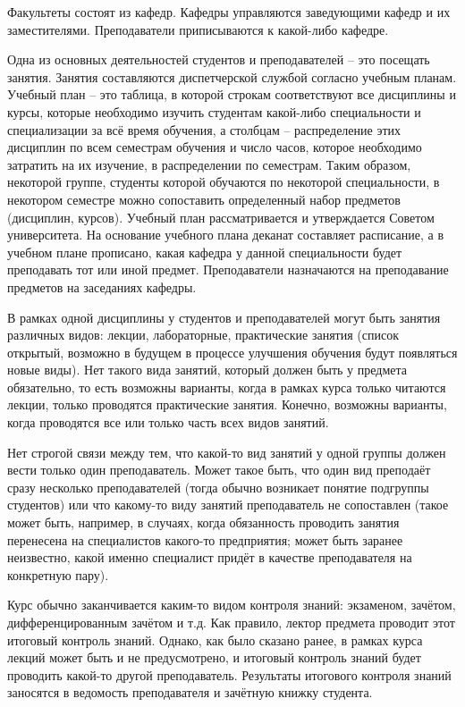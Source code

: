 Факультеты состоят из кафедр. Кафедры управляются заведующими кафедр и их заместителями. Преподаватели приписываются к какой-либо кафедре. 

Одна из основных деятельностей студентов и преподавателей -- это посещать занятия. Занятия составляются диспетчерской службой согласно учебным планам. Учебный план -- это таблица, в которой строкам соответствуют все дисциплины и курсы, которые необходимо изучить студентам какой-либо специальности и специализации за всё время обучения, а столбцам -- распределение этих дисциплин по всем семестрам обучения и число часов, которое необходимо затратить на их изучение, в распределении по семестрам. Таким образом, некоторой группе, студенты которой обучаются по некоторой специальности, в некотором семестре можно сопоставить определенный набор предметов (дисциплин, курсов). Учебный план рассматривается и утверждается Советом университета. На основание учебного плана деканат составляет расписание, а в учебном плане прописано, какая кафедра у данной специальности будет преподавать тот или иной предмет. Преподаватели назначаются на преподавание предметов на заседаниях кафедры.

В рамках одной дисциплины у студентов и преподавателей могут быть занятия различных видов: лекции, лабораторные, практические занятия (список открытый, возможно в будущем в процессе улучшения обучения будут появляться новые виды). Нет такого вида занятий, который должен быть у предмета обязательно, то есть возможны варианты, когда в рамках курса только читаются лекции, только проводятся практические занятия. Конечно, возможны варианты, когда проводятся все или только часть всех видов занятий. 

Нет строгой связи между тем, что какой-то вид занятий у одной группы должен вести только один преподаватель. Может такое быть, что один вид преподаёт сразу несколько преподавателей (тогда обычно возникает понятие подгруппы студентов) или что какому-то виду занятий преподаватель не сопоставлен (такое может быть, например, в случаях, когда обязанность проводить занятия перенесена на специалистов какого-то предприятия; может быть заранее неизвестно, какой именно специалист придёт в качестве преподавателя на конкретную пару). 

Курс обычно заканчивается каким-то видом контроля знаний: экзаменом, зачётом, дифференцированным зачётом и т.д. Как правило, лектор предмета проводит этот итоговый контроль знаний. Однако, как было сказано ранее, в рамках курса лекций может быть и не предусмотрено, и итоговый контроль знаний будет проводить какой-то другой преподаватель. Результаты итогового контроля знаний заносятся в ведомость преподавателя и зачётную книжку студента.

